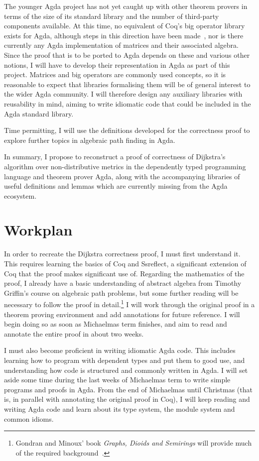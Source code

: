 \documentclass[a4paper]{article}
\begin{document}
The younger Agda project has not yet caught up with other theorem provers in terms of the size of its standard library and the number of third-party components available. At this time, no equivalent of Coq's big operator library exists for Agda, although steps in this direction have been made~\cite{gustafsson_foldable_2014}, nor is there currently any Agda implementation of matrices and their associated algebra.  Since the proof that is to be ported to Agda depends on these and various other notions, I will have to develop their representation in Agda as part of this project. Matrices and big operators are commonly used concepts, so it is reasonable to expect that libraries formalising them will be of general interest to the wider Agda community. I will therefore design any auxiliary libraries with reusability in mind, aiming to write idiomatic code that could be included in the Agda standard library.

Time permitting, I will use the definitions developed for the correctness proof to explore further topics in algebraic path finding in Agda.

In summary, I propose to reconstruct a proof of correctness of Dijkstra's algorithm over non-distributive metrics in the dependently typed programming language and theorem prover Agda, along with the accompanying libraries of useful definitions and lemmas which are currently missing from the Agda ecosystem.

\section{Workplan}
\label{workplan}

In order to recreate the Dijkstra correctness proof, I must first understand it. This requires learning the basics of Coq and Ssreflect, a significant extension of Coq that the proof makes significant use of. Regarding the mathematics of the proof, I already have a basic understanding of abstract algebra from Timothy Griffin's course on algebraic path problems, but some further reading will be necessary to follow the proof in detail.\footnote{Gondran and Minoux' book \emph{Graphs, Dioids and Semirings} will provide much of the required background~\cite{gondran_graphs_2008}.}
I will work through the original proof in a theorem proving environment and add annotations for future reference. I will begin doing so as soon as Michaelmas term finishes, and aim to read and annotate the entire proof in about two weeks.

I must also become proficient in writing idiomatic Agda code.
This includes learning how to program with dependent types and put them to good use, and understanding how code is structured and commonly written in Agda.
I will set aside some time during the last weeks of Michaelmas term to write simple programs and proofs in Agda.
From the end of Michaelmas until Christmas (that is, in parallel with annotating the original proof in Coq), I will keep reading and writing Agda code and learn about its type system, the module system and common idioms.
\end{document}
